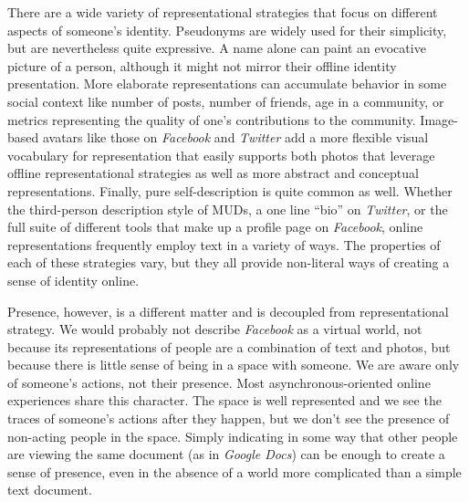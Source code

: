 There are a wide variety of representational strategies that focus on different aspects of someone's identity. Pseudonyms are widely used for their simplicity, but are nevertheless quite expressive. A name alone can paint an evocative picture of a person, although it might not mirror their offline identity presentation. \citep{Jacobson:1996tb} More elaborate representations can accumulate behavior in some social context like number of posts, number of friends, age in a community, or metrics representing the quality of one's contributions to the community. Image-based avatars like those on \emph{Facebook} and \emph{Twitter} add a more flexible visual vocabulary for representation that easily supports both photos that leverage offline representational strategies as well as more abstract and conceptual representations. Finally, pure self-description is quite common as well. Whether the third-person description style of MUDs, a one line ``bio'' on \emph{Twitter}, or the full suite of different tools that make up a profile page on \emph{Facebook}, online representations frequently employ text in a variety of ways. The properties of each of these strategies vary, but they all provide non-literal ways of creating a sense of identity online. 

Presence, however, is a different matter and is decoupled from representational strategy. We would probably not describe \emph{Facebook} as a virtual world, not because its representations of people are a combination of text and photos, but because there is little sense of being in a space with someone. We are aware only of someone's actions, not their presence. Most asynchronous-oriented online experiences share this character. The space is well represented and we see the traces of someone's actions after they happen, but we don't see the presence of non-acting people in the space. Simply indicating in some way that other people are viewing the same document (as in \emph{Google Docs}) can be enough to create a sense of presence, even in the absence of a world more complicated than a simple text document. 

